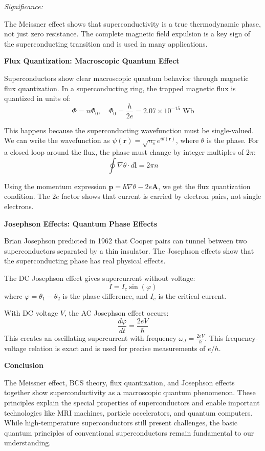 \documentclass[12pt]{article}
\begin{document}
	\textit{Significance:}
	
	The Meissner effect shows that superconductivity is a true thermodynamic phase, not just zero resistance. The complete magnetic field expulsion is a key sign of the superconducting transition and is used in many applications.
	
	\quad \textbf{Flux Quantization: Macroscopic Quantum Effect}
	
	Superconductors show clear macroscopic quantum behavior through magnetic flux quantization. In a superconducting ring, the trapped magnetic flux is quantized in units of:
	\begin{equation}
		\Phi = n\Phi_0, \quad \Phi_0 = \frac{h}{2e} = 2.07\times10^{-15} \text{ Wb}
	\end{equation}
	
	This happens because the superconducting wavefunction must be single-valued. We can write the wavefunction as $\psi(\mathbf{r}) = \sqrt{n_s}e^{i\theta(\mathbf{r})}$, where $\theta$ is the phase. For a closed loop around the flux, the phase must change by integer multiples of $2\pi$:
	\begin{equation}
		\oint \nabla\theta \cdot d\mathbf{l} = 2\pi n
	\end{equation}
	
	Using the momentum expression $\mathbf{p} = \hbar\nabla\theta - 2e\mathbf{A}$, we get the flux quantization condition. The $2e$ factor shows that current is carried by electron pairs, not single electrons.
	
	\quad \textbf{Josephson Effects: Quantum Phase Effects}
	
	Brian Josephson predicted in 1962 that Cooper pairs can tunnel between two superconductors separated by a thin insulator. The Josephson effects show that the superconducting phase has real physical effects.
	
	The DC Josephson effect gives supercurrent without voltage:
	\begin{equation}
		I = I_c \sin(\varphi)
	\end{equation}
	where $\varphi = \theta_1 - \theta_2$ is the phase difference, and $I_c$ is the critical current.
	
	With DC voltage $V$, the AC Josephson effect occurs:
	\begin{equation}
		\frac{d\varphi}{dt} = \frac{2eV}{\hbar}
	\end{equation}
	This creates an oscillating supercurrent with frequency $\omega_J = \frac{2eV}{\hbar}$. This frequency-voltage relation is exact and is used for precise measurements of $e/h$.
	
	\quad \textbf{Conclusion}
	
	The Meissner effect, BCS theory, flux quantization, and Josephson effects together show superconductivity as a macroscopic quantum phenomenon. These principles explain the special properties of superconductors and enable important technologies like MRI machines, particle accelerators, and quantum computers. While high-temperature superconductors still present challenges, the basic quantum principles of conventional superconductors remain fundamental to our understanding.
	
\end{document}
